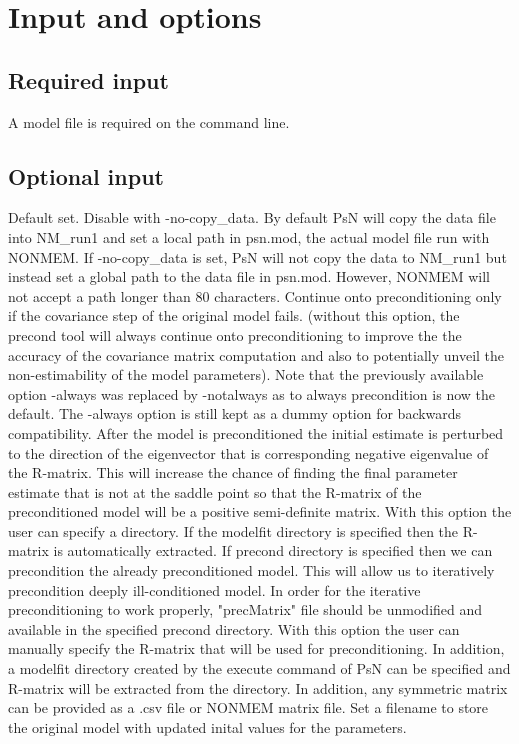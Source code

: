 \section{Input and options}

\subsection{Required input}
A model file is required on the command line.

\subsection{Optional input}

\begin{optionlist}
Default set. Disable with -no-copy\_data. By default PsN will copy the data file into NM\_run1 and set a local path in psn.mod, the actual model file run with NONMEM. If -no-copy\_data is set, PsN will not copy the data to NM\_run1 but instead set a global path to the data file in psn.mod. However, NONMEM will not accept a path longer than 80 characters.
\nextopt
{}
Continue onto preconditioning only if the covariance step of the original model fails. (without this option, the precond tool will always continue onto preconditioning to improve the the accuracy of the covariance matrix computation and also to potentially unveil the non-estimability of the model parameters). Note that the previously available option -always was replaced by -notalways as to always precondition is now the default. The -always option is still kept as a dummy option for backwards compatibility.
\nextopt
{}
After the model is preconditioned the initial estimate is perturbed to the direction of the eigenvector that is corresponding negative eigenvalue of the R-matrix. This will increase the chance of finding the final parameter estimate that is not at the saddle point so that the R-matrix of the preconditioned model will be a positive semi-definite matrix.
\nextopt
{}
With this option the user can specify a directory. If the modelfit directory is specified then the R-matrix is automatically extracted. If precond directory is specified then we can precondition the already preconditioned model. This will allow us to iteratively precondition deeply ill-conditioned model. In order for the iterative preconditioning to work properly, "precMatrix" file should be unmodified and available in the specified precond directory.
\nextopt
{}
With this option the user can manually specify the R-matrix that will be used for preconditioning. In addition, a modelfit directory created by the execute command of PsN can be specified and R-matrix will be extracted from the directory. In addition, any symmetric matrix can be provided as a .csv file or NONMEM matrix file.
\nextopt
{}
Set a filename to store the original model with updated inital values for the parameters.	
\nextopt
\end{optionlist}


